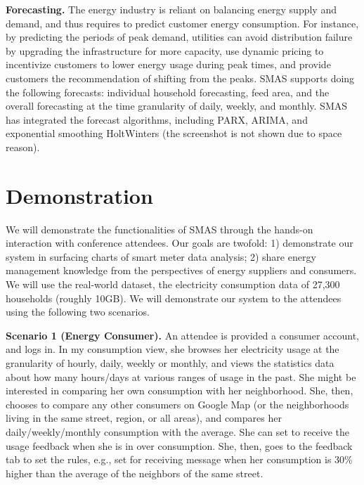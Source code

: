 \documentclass{sig-alternate}
\newcommand{\eg}{e.g.}
\begin{document}
{\bf Forecasting.}
The energy industry is reliant on balancing energy supply and demand, and thus requires to predict customer energy consumption. For instance, by predicting the periods of peak demand, utilities can avoid distribution failure by upgrading the infrastructure for more capacity, use dynamic pricing to incentivize customers to lower energy usage during peak times, and provide customers the recommendation of shifting from the peaks.  SMAS supports doing the following forecasts: individual household forecasting, feed area, and the overall forecasting at the time granularity of daily, weekly, and monthly. SMAS has integrated the forecast algorithms, including PARX, ARIMA, and exponential smoothing HoltWinters (the screenshot is not shown due to space reason). 



\section{Demonstration}
We will demonstrate the functionalities of SMAS through the hands-on interaction with conference attendees. Our goals are two\-fold: 1) demonstrate  our system in surfacing charts of smart meter data analysis; 2) share energy management knowledge from the perspectives of energy suppliers and consumers. We will use the real-world dataset, the electricity consumption data of 27,300 households
(roughly 10GB). We will demonstrate our system to the attendees using the following two scenarios.

{\bf Scenario 1 (Energy Consumer).} An attendee is provided a consumer account, and logs in. In my consumption view, she browses her electricity usage at the granularity of hourly, daily, weekly or monthly, and views the statistics data about how many hours/days at various ranges of usage in the past. She might be interested in comparing her own consumption with her neighborhood. She, then, chooses to compare  any other consumers on Google Map (or the neighborhoods living in the same street, region, or all areas), and compares her daily/weekly/monthly consumption with the average. She can set to receive the usage feedback when she is in over consumption. She, then, goes to the feedback tab to set the rules, \eg, set for receiving message when her consumption is 30\% higher than the average of the neighbors of the same street.
\end{document}
